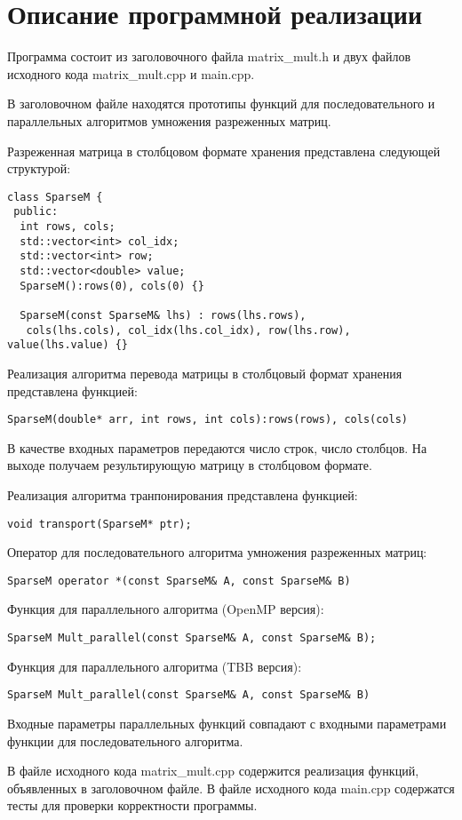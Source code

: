 \documentclass{report}
\begin{document}
\section*{Описание программной реализации}
Программа состоит из заголовочного файла matrix\_mult.h и двух файлов исходного кода  matrix\_mult.cpp и main.cpp.
\par В заголовочном файле находятся прототипы функций для последовательного и параллельных алгоритмов умножения разреженных матриц.
\par Разреженная матрица в столбцовом формате хранения представлена следующей структурой:
\begin{lstlisting}
class SparseM {
 public:
  int rows, cols;
  std::vector<int> col_idx;
  std::vector<int> row;
  std::vector<double> value;
  SparseM():rows(0), cols(0) {}
  
  SparseM(const SparseM& lhs) : rows(lhs.rows),
   cols(lhs.cols), col_idx(lhs.col_idx), row(lhs.row), value(lhs.value) {}
\end{lstlisting}
\par Реализация алгоритма перевода матрицы в столбцовый формат хранения
представлена функцией:
\begin{lstlisting}
SparseM(double* arr, int rows, int cols):rows(rows), cols(cols) 
  \end{lstlisting}
В качестве входных параметров передаются число строк, число столбцов. На выходе получаем результирующую матрицу в столбцовом формате.
\par Реализация алгоритма транпонирования представлена функцией:
\begin{lstlisting}
void transport(SparseM* ptr);
\end{lstlisting}

\par Оператор для последовательного алгоритма умножения разреженных матриц:
\begin{lstlisting}
SparseM operator *(const SparseM& A, const SparseM& B) 
\end{lstlisting}

\par Функция для параллельного алгоритма (OpenMP версия):
\begin{lstlisting}
SparseM Mult_parallel(const SparseM& A, const SparseM& B);
\end{lstlisting}
\par Функция для параллельного алгоритма (TBB версия):
\begin{lstlisting}
SparseM Mult_parallel(const SparseM& A, const SparseM& B)
\end{lstlisting}
Входные параметры параллельных функций совпадают с входными параметрами функции для последовательного алгоритма.
\par В файле исходного кода matrix\_mult.cpp содержится реализация функций, объявленных в заголовочном файле. В файле исходного кода main.cpp содержатся тесты для проверки корректности программы.
\newpage
\end{document}

